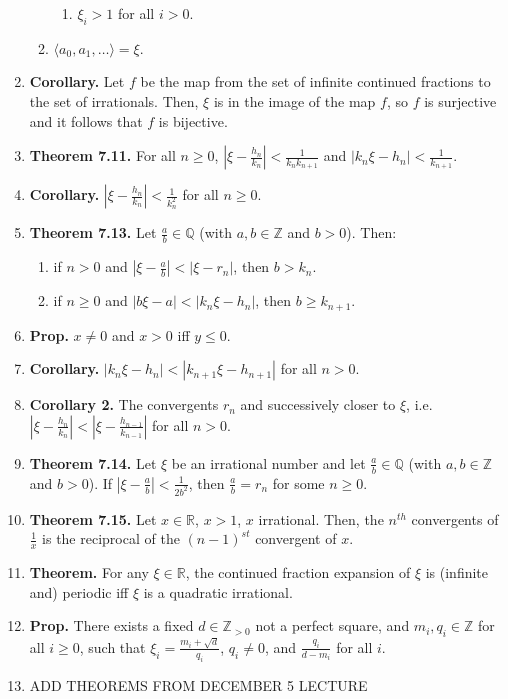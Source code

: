 \documentclass[11pt]{article}
\theoremstyle{definition}
\theoremstyle{named}
\begin{document}
\begin{enumerate}
\begin{enumerate}
\begin{enumerate}
            \item $\xi_i>1$ for all $i>0$. 
        \end{enumerate} 
        \item $\langle a_0,a_1,\dots \rangle = \xi$. 
    \end{enumerate}
    \item \textbf{Corollary. } Let $f$ be the map from the set of infinite continued fractions to the set of irrationals. Then, $\xi$ is in the image of the map $f$, so $f$ is surjective and it follows that $f$ is bijective. 
    \item \textbf{Theorem 7.11. } For all $n \geq 0$, $|\xi - \frac{h_n}{k_n}| < \frac{1}{k_nk_{n+1}}$ and $|k_n\xi - h_n| < \frac{1}{k_{n+1}}$. 
    \item \textbf{Corollary. } $|\xi - \frac{h_n}{k_n}| < \frac{1}{k_n^2}$ for all $n \geq 0$. 
    \item \textbf{Theorem 7.13. } Let $\frac{a}{b} \in \mathbb{Q}$ (with $a,b \in \mathbb{Z}$ and $b>0$). Then: 
    \begin{enumerate}
        \item if $n>0$ and $|\xi - \frac{a}{b}| < |\xi - r_n|$, then $b > k_n$. 
        \item if $n \geq 0$ and $|b\xi - a| < |k_n\xi - h_n|$, then $b \geq k_{n+1}$. 
    \end{enumerate}
    \item \textbf{Prop. } $x \neq 0$ and $x>0$ iff $y \leq 0$. 
    \item \textbf{Corollary. } $|k_n\xi - h_n| < |k_{n+1}\xi-h_{n+1}|$ for all $n>0$. 
    \item \textbf{Corollary 2. } The convergents $r_n$ and successively closer to $\xi$, i.e. $|\xi - \frac{h_n}{k_n}| < |\xi - \frac{h_{n-1}}{k_{n-1}}|$ for all $n>0$. 
    \item \textbf{Theorem 7.14. } Let $\xi$ be an irrational number and let $\frac{a}{b} \in \mathbb{Q}$ (with $a,b \in \mathbb{Z}$ and $b>0$). If $|\xi - \frac{a}{b}| < \frac{1}{2b^2}$, then $\frac{a}{b} = r_n$ for some $n \geq 0$. 
    \item \textbf{Theorem 7.15. } Let $x \in \mathbb{R}$, $x>1$, $x$ irrational. Then, the $n^{th}$ convergents of $\frac{1}{x}$ is the reciprocal of the $(n-1)^{st}$ convergent of $x$. 
    \item \textbf{Theorem. } For any $\xi \in \mathbb{R}$, the continued fraction expansion of $\xi$ is (infinite and) periodic iff $\xi$ is a quadratic irrational. 
    \item \textbf{Prop. } There exists a fixed $d \in \mathbb{Z}_{>0}$ not a perfect square, and $m_i,q_i \in \mathbb{Z}$ for all $i \geq 0$, such that $\xi_i = \frac{m_i + \sqrt{d}}{q_i}$, $q_i \neq 0$, and $\frac{q_i}{d-m_i}$ for all $i$. 
    \item ADD THEOREMS FROM DECEMBER 5 LECTURE
\end{enumerate}
\end{document}
